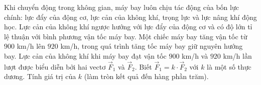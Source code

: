 \begin{ex}
Khi chuyển động trong không gian, máy bay luôn chịu tác động của bốn lực chính: lực đẩy của động cơ, lực cản của không khí, trọng lực và lực nâng khí động học. Lực cản của không khí ngược hướng với lực đẩy của động cơ và có độ lớn tỉ lệ thuận với bình phương vận tốc máy bay. Một chiếc máy bay tăng vận tốc từ $900$ km/h lên $920$ km/h, trong quá trình tăng tốc máy bay giữ nguyên hướng bay. Lực cản của không khí khi máy bay đạt vận tốc $900$ km/h và $920$ km/h lần lượt được biểu diễn bởi hai vectơ $\vec F_1$ và $\vec F_2$. Biết $\vec F_1=k\cdot\vec F_2$ với $k$ là một số thực dương. Tính giá trị của $k$ (làm tròn kết quả đến hàng phần trăm).
\end{ex}
